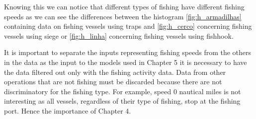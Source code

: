 Knowing this we can notice that different types of fishing have different fishing speeds as we can see the differences between the histogram \ref{fig:h_armadilhas} containing data on fishing vessels using traps and \ref{fig:h_cerco} concerning fishing vessels using siege or \ref{fig:h_linha} concerning fishing vessels using fishhook.





It is important to separate the inputs representing fishing speeds from the others in the data as the input to the models used in Chapter 5 it is necessary to have the data filtered out only with the fishing activity data.
Data from other operations that are not fishing must be discarded because there are not discriminatory for the fishing type. For example, speed 0 nautical miles is not interesting as all vessels, regardless of their type of fishing, stop at the fishing port.
Hence the importance of Chapter 4.






